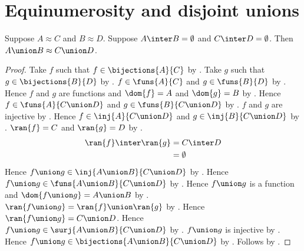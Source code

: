 

\section{Equinumerosity and disjoint unions}

\begin{theorem}\label{disjoint_union_equinum_congruent}
    Suppose $A\approx C$ and $B\approx D$.
    Suppose $A\inter B=\emptyset$ and $C\inter D=\emptyset$.
    Then $A\union B\approx C\union D$.
\end{theorem}
\begin{proof}
    Take $f$ such that $f\in\bijections{A}{C}$ by .
    Take $g$ such that $g\in\bijections{B}{D}$ by .
    $f\in\funs{A}{C}$ and $g\in\funs{B}{D}$
        by .
    Hence $f$ and $g$ are functions and $\dom{f}=A$ and $\dom{g}=B$
        by .
    Hence $f\in\funs{A}{C\union D}$ and
        $g\in\funs{B}{C\union D}$
        by .
    $f$ and $g$ are injective by .
    Hence $f\in\inj{A}{C\union D}$ and
        $g\in\inj{B}{C\union D}$
        by .
    $\ran{f}=C$ and $\ran{g}=D$
        by .
    \begin{align*}
        \ran{f}\inter\ran{g}
            &= C\inter D
            \\
            &= \emptyset
    \end{align*}
    Hence $f\union g\in\inj{A\union B}{C\union D}$
        by .
    Hence $f\union g\in\funs{A\union B}{C\union D}$
        by .
    Hence $f\union g$ is a function and
        $\dom{f\union g}=A\union B$
        by .
    $\ran{f\union g}=\ran{f}\union\ran{g}$ by .
    Hence $\ran{f\union g}=C\union D$.
    Hence $f\union g\in\surj{A\union B}{C\union D}$
        by .
    $f\union g$ is injective
        by .
    Hence $f\union g\in\bijections{A\union B}{C\union D}$
        by .
    Follows by .
\end{proof}

